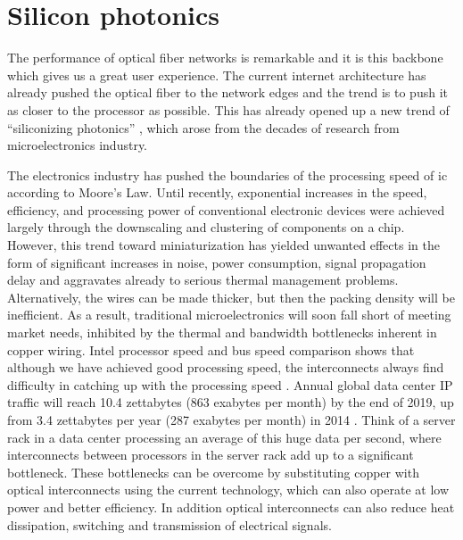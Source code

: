 \documentclass[../report.tex]{subfiles}
\begin{document}
	\section{Silicon photonics}
The performance of optical fiber networks is remarkable and it is this backbone which gives us a great user experience. The current internet architecture has already pushed the optical fiber to the network edges and the trend is to push it as closer to the processor as possible. This has already opened up a new trend of “siliconizing photonics” \cite{silicon_photonics}, which arose from the decades of research from microelectronics industry.\par 
The electronics industry has pushed the boundaries of the processing speed of \gls{ic} according to Moore’s Law. Until recently, exponential increases in the speed, efficiency, and processing power of conventional electronic devices were achieved largely through the downscaling and clustering of components on a chip. However, this trend toward miniaturization has yielded unwanted effects in the form of significant increases in noise, power consumption, signal propagation delay and aggravates already to serious thermal management problems. Alternatively, the wires can be made thicker, but then the packing density will be inefficient. As a result, traditional microelectronics will soon fall short of meeting market needs, inhibited by the thermal and bandwidth bottlenecks inherent in copper wiring. Intel processor speed and bus speed comparison shows that although we have achieved good processing speed, the interconnects always find difficulty in catching up with the processing speed \cite{intel_proc_compare}. Annual global data center IP traffic will reach 10.4 zettabytes (863 exabytes per month) by the end of 2019, up from 3.4 zettabytes per year (287 exabytes per month) in 2014 \cite{cisco_forecast_2019}. Think of a server rack in a data center processing an average of this huge data per second, where interconnects between processors in the server rack add up to a significant bottleneck. These bottlenecks can be overcome by substituting copper with optical interconnects using the current technology, which can also operate at low power and better efficiency. In addition optical interconnects can also reduce heat dissipation, switching and transmission of electrical signals.\par
\end{document}
